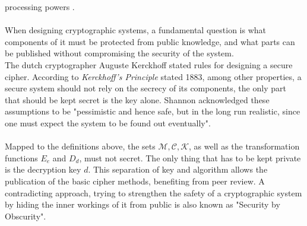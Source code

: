 processing powers \cite{GoldwasserMicali}.
\\
\\
When designing cryptographic systems, a fundamental question is what components of it must be protected from public knowledge, and what parts can be
published without compromising the security of the system. 
\\
The dutch cryptographer Auguste Kerckhoff stated rules for designing a secure cipher.
According to \textit{Kerckhoff's Principle} stated 1883, among other properties, a secure system should not rely on the secrecy of
its components, the only part that should be kept secret is the key alone. Shannon acknowledged these assumptions to be "pessimistic and hence safe, but 
in the long run realistic, since one must expect the system to be found out eventually".
\\
\\
Mapped to the definitions above, the sets $\mathcal{M, C, K}$, as well as the
transformation functions $E_e$ and $D_d$, must not secret. The only thing that has to be kept private is the decryption key $d$.
This separation of key and algorithm allows the publication of the basic cipher methods, benefiting from peer review. A contradicting approach, 
trying to strengthen the safety of a cryptographic system by hiding the inner workings of it from public is also known as "Security by Obscurity".

